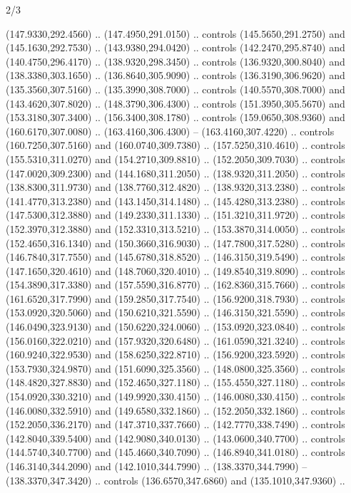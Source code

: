 \begin{flagdescription}{2/3}
\begin{scope}[shift={(0.5\flaglength,0.5)},scale=\flagwidth/480]
\begin{scope}[y=0.8pt, x=0.80pt, yscale=-1,shift={(-450,-300)}]
\begin{scope}[cm={{1.02948,0.0,0.0,1.02948,(-13.26599,6.99414)}}]
\begin{scope}[shift={(341.0917,90.34325)}]
  (147.9330,292.4560) .. (147.4950,291.0150) .. controls (145.5650,291.2750) and
  (145.1630,292.7530) .. (143.9380,294.0420) .. controls (142.2470,295.8740) and
  (140.4750,296.4170) .. (138.9320,298.3450) .. controls (136.9320,300.8040) and
  (138.3380,303.1650) .. (136.8640,305.9090) .. controls (136.3190,306.9620) and
  (135.3560,307.5160) .. (135.3990,308.7000) .. controls (140.5570,308.7000) and
  (143.4620,307.8020) .. (148.3790,306.4300) .. controls (151.3950,305.5670) and
  (153.3180,307.3400) .. (156.3400,308.1780) .. controls (159.0650,308.9360) and
  (160.6170,307.0080) .. (163.4160,306.4300) -- (163.4160,307.4220) .. controls
  (160.7250,307.5160) and (160.0740,309.7380) .. (157.5250,310.4610) .. controls
  (155.5310,311.0270) and (154.2710,309.8810) .. (152.2050,309.7030) .. controls
  (147.0020,309.2300) and (144.1680,311.2050) .. (138.9320,311.2050) .. controls
  (138.8300,311.9730) and (138.7760,312.4820) .. (138.9320,313.2380) .. controls
  (141.4770,313.2380) and (143.1450,314.1480) .. (145.4280,313.2380) .. controls
  (147.5300,312.3880) and (149.2330,311.1330) .. (151.3210,311.9720) .. controls
  (152.3970,312.3880) and (152.3310,313.5210) .. (153.3870,314.0050) .. controls
  (152.4650,316.1340) and (150.3660,316.9030) .. (147.7800,317.5280) .. controls
  (146.7840,317.7550) and (145.6780,318.8520) .. (146.3150,319.5490) .. controls
  (147.1650,320.4610) and (148.7060,320.4010) .. (149.8540,319.8090) .. controls
  (154.3890,317.3380) and (157.5590,316.8770) .. (162.8360,315.7660) .. controls
  (161.6520,317.7990) and (159.2850,317.7540) .. (156.9200,318.7930) .. controls
  (153.0920,320.5060) and (150.6210,321.5590) .. (146.3150,321.5590) .. controls
  (146.0490,323.9130) and (150.6220,324.0060) .. (153.0920,323.0840) .. controls
  (156.0160,322.0210) and (157.9320,320.6480) .. (161.0590,321.3240) .. controls
  (160.9240,322.9530) and (158.6250,322.8710) .. (156.9200,323.5920) .. controls
  (153.7930,324.9870) and (151.6090,325.3560) .. (148.0800,325.3560) .. controls
  (148.4820,327.8830) and (152.4650,327.1180) .. (155.4550,327.1180) .. controls
  (154.0920,330.3210) and (149.9920,330.4150) .. (146.0080,330.4150) .. controls
  (146.0080,332.5910) and (149.6580,332.1860) .. (152.2050,332.1860) .. controls
  (152.2050,336.2170) and (147.3710,337.7660) .. (142.7770,338.7490) .. controls
  (142.8040,339.5400) and (142.9080,340.0130) .. (143.0600,340.7700) .. controls
  (144.5740,340.7700) and (145.4660,340.7090) .. (146.8940,341.0180) .. controls
  (146.3140,344.2090) and (142.1010,344.7990) .. (138.3370,344.7990) --
  (138.3370,347.3420) .. controls (136.6570,347.6860) and (135.1010,347.9360) ..

\end{scope}
\end{scope}
\end{scope}
\end{scope}
\end{flagdescription}
